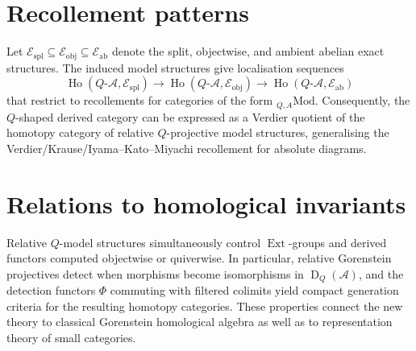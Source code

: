 \documentclass[12pt]{article}
\newcommand{\Ext}{\operatorname{Ext}}
\newcommand{\A}{\mathcal{A}}
\newcommand{\Ho}{\operatorname{Ho}}
\newcommand{\Der}{\operatorname{D}}
\begin{document}
\section*{Recollement patterns}
Let $\mathscr{E}_{\mathrm{spl}} \subseteq \mathscr{E}_{\mathrm{obj}} \subseteq \mathscr{E}_{\mathrm{ab}}$ denote the split, objectwise, and ambient abelian exact structures.  The induced model structures give localisation sequences
\[
\Ho(Q\text{-}\A, \mathscr{E}_{\mathrm{spl}}) \longrightarrow \Ho(Q\text{-}\A, \mathscr{E}_{\mathrm{obj}}) \longrightarrow \Ho(Q\text{-}\A, \mathscr{E}_{\mathrm{ab}})
\]
that restrict to recollements for categories of the form ${}_{Q,A}\mathrm{Mod}$.  Consequently, the $Q$-shaped derived category can be expressed as a Verdier quotient of the homotopy category of relative $Q$-projective model structures, generalising the Verdier/Krause/Iyama--Kato--Miyachi recollement for absolute diagrams.

\section*{Relations to homological invariants}
Relative $Q$-model structures simultaneously control $\Ext$-groups and derived functors computed objectwise or quiverwise.  In particular, relative Gorenstein projectives detect when morphisms become isomorphisms in $\Der_Q(\A)$, and the detection functors $\Phi$ commuting with filtered colimits yield compact generation criteria for the resulting homotopy categories.  These properties connect the new theory to classical Gorenstein homological algebra as well as to representation theory of small categories.
\end{document}
